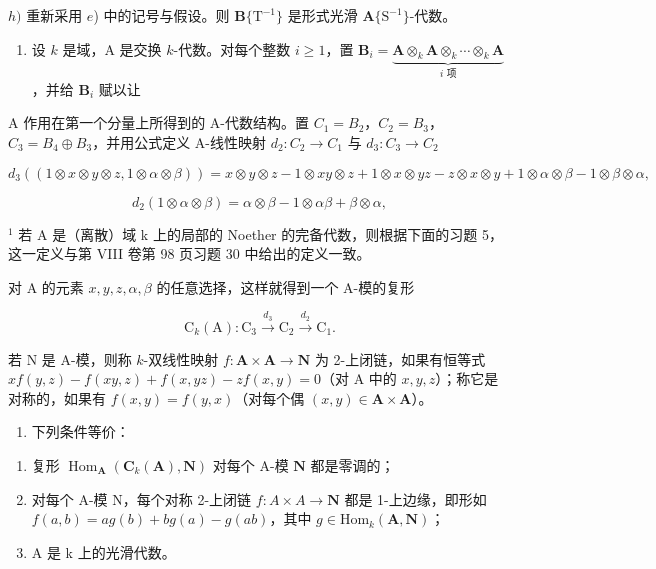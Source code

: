 \(h)\) 重新采用 \(e\)) 中的记号与假设。则 \(\mathbf{B}\{\mathrm{T}^{-1}\}\) 是形式光滑 \(\mathbf{A}\{\mathrm{S}^{-1}\}\)-代数。

\begin{enumerate}
\def\labelenumi{\arabic{enumi})}
\setcounter{enumi}{2}
\tightlist
\item
  设 \(k\) 是域，A 是交换 \(k\)-代数。对每个整数 \(i \geqslant 1\)，置 \(\mathbf{B}_i = \underbrace{\mathbf{A} \otimes_k \mathbf{A} \otimes_k \cdots \otimes_k \mathbf{A}}_{i \text{ 项}}\)，并给 \(\mathbf{B}_i\) 赋以让
\end{enumerate}

A 作用在第一个分量上所得到的 A-代数结构。置 \(C_{1} = B_{2}\)，\(C_{2} = B_{3}\)，\(C_{3} = B_{4} \oplus B_{3}\)，并用公式定义 A-线性映射 \(d_{2}:C_{2} \to C_{1}\) 与 \(d_{3}:C_{3} \to C_{2}\)

\[
d _ {3} ((1 \otimes x \otimes y \otimes z, 1 \otimes \alpha \otimes \beta)) = x \otimes y \otimes z - 1 \otimes x y \otimes z + 1 \otimes x \otimes y z - z \otimes x \otimes y + 1 \otimes \alpha \otimes \beta - 1 \otimes \beta \otimes \alpha,
\]

\[
d _ {2} (1 \otimes \alpha \otimes \beta) = \alpha \otimes \beta - 1 \otimes \alpha \beta + \beta \otimes \alpha ,
\]

\(^{1}\) 若 A 是（离散）域 k 上的局部的 Noether 的完备代数，则根据下面的习题 5，这一定义与第 VIII 卷第 98 页习题 30 中给出的定义一致。

对 A 的元素 \(x, y, z, \alpha, \beta\) 的任意选择，这样就得到一个 A-模的复形

\[
\mathrm{C} _ {k} (\mathrm{A}): \mathrm{C} _ {3} \xrightarrow {d _ {3}} \mathrm{C} _ {2} \xrightarrow {d _ {2}} \mathrm{C} _ {1}.
\]

若 N 是 A-模，则称 \(k\)-双线性映射 \(f: \mathbf{A} \times \mathbf{A} \to \mathbf{N}\) 为 2-上闭链，如果有恒等式 \(xf(y, z) - f(xy, z) + f(x, yz) - zf(x, y) = 0\)（对 A 中的 \(x, y, z\)）；称它是对称的，如果有 \(f(x, y) = f(y, x)\)（对每个偶 \((x, y) \in \mathbf{A} \times \mathbf{A}\)）。

\begin{enumerate}
\def\labelenumi{\alph{enumi})}
\tightlist
\item
  下列条件等价：
\end{enumerate}

\begin{enumerate}
\def\labelenumi{(\roman{enumi})}
\item
  复形 \(\operatorname{Hom}_{\mathbf{A}}(\mathbf{C}_k(\mathbf{A}), \mathbf{N})\) 对每个 A-模 \(\mathbf{N}\) 都是零调的；
\item
  对每个 A-模 N，每个对称 2-上闭链 \(f:A\times A\to\mathbf{N}\) 都是 1-上边缘，即形如 \(f(a,b)=ag(b)+bg(a)-g(ab)\)，其中 \(g\in\mathrm{Hom}_{k}(\mathbf{A},\mathbf{N})\)；
\item
  A 是 k 上的光滑代数。
\end{enumerate}

